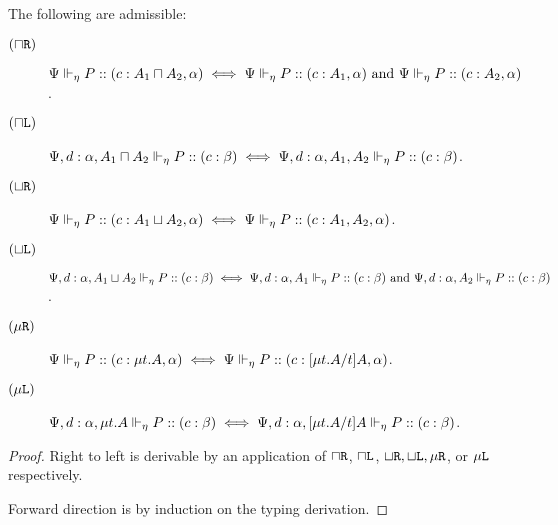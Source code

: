 \begin{lemma}[Invertibility]
  The following are admissible:
  \begin{description}
    \item[$(\mathbin{\sqcap}\texttt{R})$] ${\Psi} \Vdash_{\eta} P :: (c : A_1 \mathbin{\sqcap} A_2, \alpha) \iff {\Psi} \Vdash_{\eta} P :: (c : A_1, \alpha) \text{ and } {\Psi} \Vdash_{\eta} P :: (c : A_2, \alpha)$.
    \item[$(\mathbin{\sqcap}\texttt{L})$] ${\Psi, d : \alpha, A_1 \mathbin{\sqcap} A_2} \Vdash_{\eta} P :: (c : \beta) \iff {\Psi, d : \alpha, A_1, A_2} \Vdash_{\eta} P :: (c : \beta)$.

    \item[$(\mathbin{\sqcup}\texttt{R})$] ${\Psi} \Vdash_{\eta} P :: (c : A_1 \mathbin{\sqcup} A_2, \alpha) \iff {\Psi} \Vdash_{\eta} P :: (c : A_1, A_2, \alpha)$.
    \item[$(\mathbin{\sqcup}\texttt{L})$] ${\Psi, d : \alpha, A_1 \mathbin{\sqcup} A_2} \Vdash_{\eta} P :: (c : \beta) \iff
    {\Psi, d : \alpha, A_1} \Vdash_{\eta} P :: (c : \beta)
    \text{ and } {\Psi, d : \alpha, A_2} \Vdash_{\eta} P :: (c : \beta)$.

    \item[$(\mu\texttt{R})$] ${\Psi} \Vdash_{\eta} P :: (c : \mu{t} . {A}, \alpha) \iff {\Psi} \Vdash_{\eta} P :: (c : \lbrack{\mu{t} . {A}}/{t}\rbrack{A}, \alpha)$.
    \item[$(\mu\texttt{L})$] ${\Psi, d : \alpha, \mu{t} . {A}} \Vdash_{\eta} P :: (c : \beta) \iff
    {\Psi, d : \alpha, \lbrack{\mu{t} . {A}}/{t}\rbrack{A}} \Vdash_{\eta} P :: (c : \beta)$.
  \end{description}
\end{lemma}
\begin{proof}
  Right to left is derivable by an application of $\mathbin{\sqcap}\texttt{R}$, $\mathbin{\sqcap}\texttt{L}$, $\mathbin{\sqcup}\texttt{R}, \mathbin{\sqcup}\texttt{L}, \mu\texttt{R}$, or $\mu\texttt{L}$ respectively.

  Forward direction is by induction on the typing derivation. 
\end{proof}


